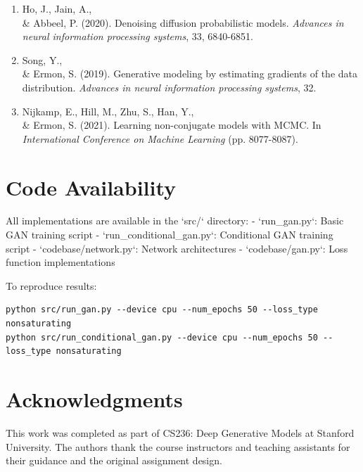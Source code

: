 \documentclass{article}
\begin{document}
\begin{enumerate}
\item Ho, J., Jain, A., \\& Abbeel, P. (2020). Denoising diffusion probabilistic models. \textit{Advances in neural information processing systems}, 33, 6840-6851.

\item Song, Y., \\& Ermon, S. (2019). Generative modeling by estimating gradients of the data distribution. \textit{Advances in neural information processing systems}, 32.

\item Nijkamp, E., Hill, M., Zhu, S., Han, Y., \\& Ermon, S. (2021). Learning non-conjugate models with MCMC. In \textit{International Conference on Machine Learning} (pp. 8077-8087).
\end{enumerate}

\section*{Code Availability}

All implementations are available in the `src/` directory:
- `run_gan.py`: Basic GAN training script
- `run_conditional_gan.py`: Conditional GAN training script
- `codebase/network.py`: Network architectures
- `codebase/gan.py`: Loss function implementations

To reproduce results:
\begin{verbatim}
python src/run_gan.py --device cpu --num_epochs 50 --loss_type nonsaturating
python src/run_conditional_gan.py --device cpu --num_epochs 50 --loss_type nonsaturating
\end{verbatim}

\section*{Acknowledgments}

This work was completed as part of CS236: Deep Generative Models at Stanford University. The authors thank the course instructors and teaching assistants for their guidance and the original assignment design.
\end{document}
